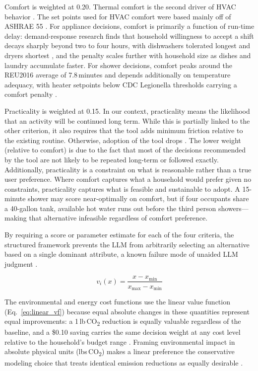 \documentclass[final,3p,times]{elsarticle}
\begin{document}
Comfort is weighted at 0.20. Thermal comfort is the second driver of HVAC behavior \cite{aqilah2022,karjalainen2007}. The set points used for HVAC comfort were based mainly off of ASHRAE 55 \cite{ashrae55,dedear2002}. For appliance decisions, comfort is primarily a function of run-time delay: demand-response research finds that household willingness to accept a shift decays sharply beyond two to four hours, with dishwashers tolerated longest and dryers shortest \cite{paetz2012,waseem2020}, and the penalty scales further with household size as dishes and laundry accumulate faster. For shower decisions, comfort peaks around the REU2016 average of 7.8\,minutes \cite{reu2016,harrispoll2024} and depends additionally on temperature adequacy, with heater setpoints below CDC Legionella thresholds carrying a comfort penalty \cite{cdc2026}.

Practicality is weighted at 0.15. In our context, practicality means the likelihood that an activity will be continued long term. While this is partially linked to the other criterion, it also requires that the tool adds minimum friction relative to the existing routine. Otherwise, adoption of the tool drops \cite{ariely2001,leclerc1995,gardner2020,mergelsberg2020}. The lower weight (relative to comfort) is due to the fact that most of the decisions recommended by the tool are not likely to be repeated long-term or followed exactly. Additionally, practicality is a constraint on what is reasonable rather than a true user preference. Where comfort captures what a household would prefer given no constraints, practicality captures what is feasible and sustainable to adopt. A 15-minute shower may score near-optimally on comfort, but if four occupants share a 40-gallon tank, available hot water runs out before the third person showers---making that alternative infeasible regardless of comfort preference.

By requiring a score or parameter estimate for each of the four criteria, the structured framework prevents the LLM from arbitrarily selecting an alternative based on a single dominant attribute, a known failure mode of unaided LLM judgment \cite{wang2024fairescalers}.

\begin{equation}
\label{eq:linear_vf}
v_i(x) = \frac{x - x_{\min}}{x_{\max} - x_{\min}}
\end{equation}

The environmental and energy cost functions use the linear value function (Eq.~\ref{eq:linear_vf}) because equal absolute changes in these quantities represent equal improvements: a 1\,lb\,CO\textsubscript{2} reduction is equally valuable regardless of the baseline, and a \$0.10 saving carries the same decision weight at any cost level relative to the household's budget range \cite{dyer1979,keeneyraiffa1976}. Framing environmental impact in absolute physical units (lbs\,CO\textsubscript{2}) makes a linear preference the conservative modeling choice that treats identical emission reductions as equally desirable \cite{keeneyraiffa1976}.
\end{document}
